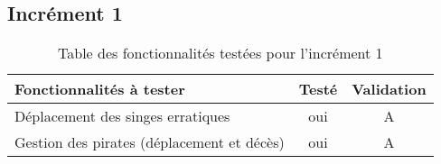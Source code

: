 	\subsection{Incrément 1}
\begin{table}[!h]
\begin{center}
\begin{tabular}{|p{10cm}|c|c|}
\hline
\textbf{Fonctionnalités à tester} & \textbf{Testé} & \textbf{Validation} \\\hline
Déplacement des singes erratiques			& oui & A \\\hline
Gestion des pirates (déplacement et décès)	& oui & A \\\hline
\end{tabular}
\end{center}
\caption{Table des fonctionnalités testées pour l'incrément 1}
\end{table}

